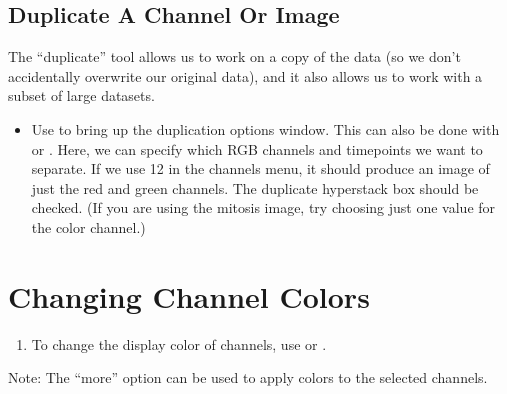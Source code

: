 \documentclass[letterpaper,10pt,english]{jupyterBook}
\begin{document}
\subsection{Duplicate A Channel Or Image}
\label{\detokenize{basics:duplicate-a-channel-or-image}}
\sphinxAtStartPar
The “duplicate” tool allows us to work on a copy of the data (so we don’t accidentally overwrite our original data),
and it also allows us to work with a subset of large datasets.
\begin{itemize}
\item {} 
\sphinxAtStartPar
Use  to bring up the duplication options window. This can also be
done with  or . Here, we can specify which RGB
channels and timepoints we want to separate. If we use 1\sphinxhyphen{}2 in the channels menu, it
should produce an image of just the red and green channels. The duplicate hyperstack box should be checked.
(If you are using the mitosis image, try choosing just one value for the color channel.)

\end{itemize}

\sphinxAtStartPar
{}


\section{Changing Channel Colors}
\label{\detokenize{basics:changing-channel-colors}}\begin{enumerate}
%
\item {} 
\sphinxAtStartPar
To change the display color of channels, use  or .

\end{enumerate}

\sphinxAtStartPar
{}

\sphinxAtStartPar
Note: The “more” option can be used to apply colors to the selected channels.
\end{document}
